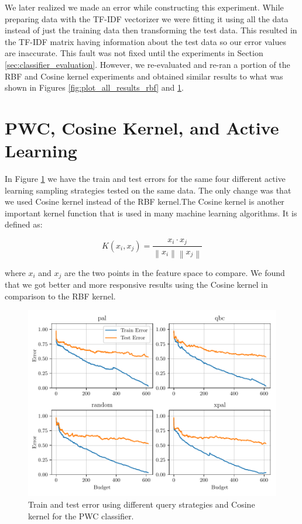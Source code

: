 We later realized we made an error while constructing this experiment. While preparing data with the TF-IDF vectorizer we were fitting it using all the data instead of just the training data then transforming the test data. This resulted in the TF-IDF matrix having information about the test data so our error values are inaccurate. This fault was not fixed until the experiments in Section \ref{sec:classifier_evaluation}. However, we re-evaluated and re-ran a portion of the RBF and Cosine kernel experiments and obtained similar results to what was shown in Figures \ref{fig:plot_all_results_rbf} and \ref{fig:plot_all_results_cosine}.

\section{PWC, Cosine Kernel, and Active Learning}

In Figure \ref{fig:plot_all_results_cosine} we have the train and test errors for the same four different active learning sampling strategies tested on the same data. The only change was that we used Cosine kernel instead of the RBF kernel.The Cosine kernel is another important kernel function that is used in many machine learning algorithms. It is defined as:

\begin{equation}
    K(x_i, x_j) = \frac{x_i \cdot x_j}{\left\| x_i \right\| \left\| x_j \right\|}
\label{eq:cosine_kernel}
\end{equation}

where $x_i$ and $x_j$ are the two points in the feature space to compare. We found that we got better and more responsive results using the Cosine kernel in comparison to the RBF kernel.  

\begin{figure}[ht]
  \centering
  \includegraphics[width=\scale\textwidth]{../img/plot_all_results_cosine.pdf}
  \caption{Train and test error using different query strategies and Cosine kernel for the PWC classifier.}
  \label{fig:plot_all_results_cosine}
\end{figure}


